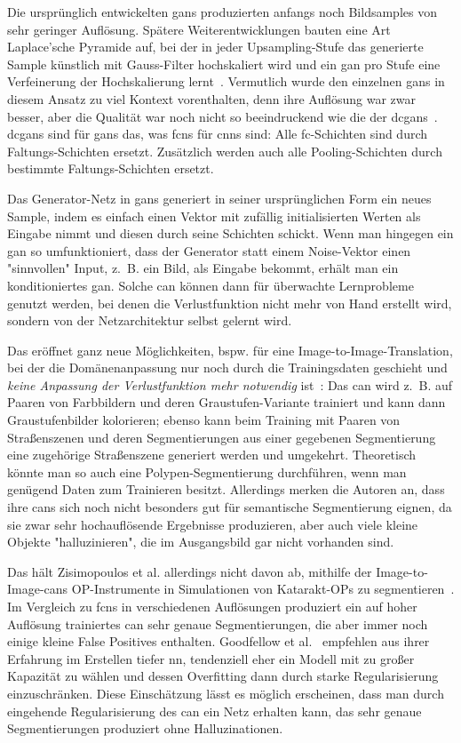 Die ursprünglich entwickelten \glspl{gan} produzierten anfangs noch Bildsamples von sehr geringer Auflösung.
Spätere Weiterentwicklungen bauten eine Art Laplace'sche Pyramide auf, bei der in jeder Upsampling-Stufe das generierte Sample künstlich mit Gauss-Filter hochskaliert wird und ein \gls{gan} pro Stufe eine Verfeinerung der Hochskalierung lernt~\cite{Denton.2015}.
Vermutlich wurde den einzelnen \glspl{gan} in diesem Ansatz zu viel Kontext vorenthalten, denn ihre Auflösung war zwar besser, aber die Qualität war noch nicht so beeindruckend wie die der \glspl{dcgan}~\cite{Radford.2016}.
\glspl{dcgan} sind für \glspl{gan} das, was \glspl{fcn} für \glspl{cnn} sind:
Alle \gls{fc}-Schichten sind durch Faltungs-Schichten ersetzt.
Zusätzlich werden auch alle Pooling-Schichten durch bestimmte Faltungs-Schichten ersetzt.

Das Generator-Netz in \glspl{gan} generiert in seiner ursprünglichen Form ein neues Sample, indem es einfach einen Vektor mit zufällig initialisierten Werten als Eingabe nimmt und diesen durch seine Schichten schickt.
Wenn man hingegen ein \gls{gan} so umfunktioniert, dass der Generator statt einem Noise-Vektor einen "sinnvollen" Input, z.~B. ein Bild, als Eingabe bekommt, erhält man ein konditioniertes \gls{gan}.
Solche \gls{can} können dann für überwachte Lernprobleme genutzt werden, bei denen die Verlustfunktion nicht mehr von Hand erstellt wird, sondern von der Netzarchitektur selbst gelernt wird.

Das eröffnet ganz neue Möglichkeiten, bspw. für eine Image-to-Image-Translation, bei der die Domänenanpassung nur noch durch die Trainingsdaten geschieht und \emph{keine Anpassung der Verlustfunktion mehr notwendig} ist~\cite{Isola.2017}:
Das \gls{can} wird z.~B. auf Paaren von Farbbildern und deren Graustufen-Variante trainiert und kann dann Graustufenbilder kolorieren; ebenso kann beim Training mit Paaren von Straßenszenen und deren Segmentierungen aus einer gegebenen Segmentierung eine zugehörige Straßenszene generiert werden und umgekehrt.
Theoretisch könnte man so auch eine Polypen-Segmentierung durchführen, wenn man genügend Daten zum Trainieren besitzt.
Allerdings merken die Autoren an, dass ihre \glspl{can} sich noch nicht besonders gut für semantische Segmentierung eignen, da sie zwar sehr hochauflösende Ergebnisse produzieren, aber auch viele kleine Objekte "halluzinieren", die im Ausgangsbild gar nicht vorhanden sind.

Das hält Zisimopoulos et al. allerdings nicht davon ab, mithilfe der Image-to-Image-\glspl{can} OP-Instrumente in Simulationen von Katarakt-OPs zu segmentieren~\cite{Zisimopoulos.2017}.
Im Vergleich zu \glspl{fcn} in verschiedenen Auflösungen produziert ein auf hoher Auflösung trainiertes \gls{can} sehr genaue Segmentierungen, die aber immer noch einige kleine False Positives enthalten.
Goodfellow et al.~\cite{Goodfellow.2016} empfehlen aus ihrer Erfahrung im Erstellen tiefer \gls{nn}, tendenziell eher ein Modell mit zu großer Kapazität zu wählen und dessen Overfitting dann durch starke Regularisierung einzuschränken.
Diese Einschätzung lässt es möglich erscheinen, dass man durch eingehende Regularisierung des \gls{can} ein Netz erhalten kann, das sehr genaue Segmentierungen produziert ohne Halluzinationen.

